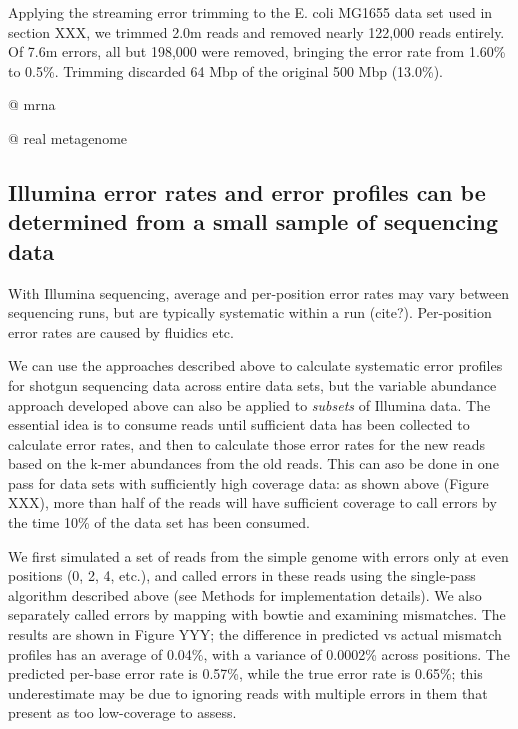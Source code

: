 \documentclass{article}
\begin{document}
Applying the streaming error trimming to the E. coli MG1655 data set
used in section XXX, we trimmed 2.0m reads and removed nearly 122,000
reads entirely.  Of 7.6m errors, all but 198,000 were removed,
bringing the error rate from 1.60\% to 0.5\%.  Trimming discarded 64
Mbp of the original 500 Mbp (13.0\%).


@ mrna


@ real metagenome

\subsection{Illumina error rates and error profiles can be determined from a
small sample of sequencing data}

With Illumina sequencing, average and per-position error rates may
vary between sequencing runs, but are typically systematic within a
run (cite?).  Per-position error rates are caused by fluidics etc.

We can use the approaches described above to calculate systematic
error profiles for shotgun sequencing data across entire data sets,
but the variable abundance approach developed above can also be
applied to {\em subsets} of Illumina data.  The essential idea is to
consume reads until sufficient data has been collected to calculate
error rates, and then to calculate those error rates for the new reads
based on the k-mer abundances from the old reads.  This can aso be
done in one pass for data sets with sufficiently high coverage data:
as shown above (Figure XXX), more than half of the reads will have
sufficient coverage to call errors by the time 10\% of the data set
has been consumed.

We first simulated a set of reads from the simple genome with errors
only at even positions (0, 2, 4, etc.), and called errors in these
reads using the single-pass algorithm described above (see Methods for
implementation details).  We also separately called errors by mapping
with bowtie and examining mismatches.  The results are shown in Figure
YYY; the difference in predicted vs actual mismatch profiles has an
average of 0.04\%, with a variance of 0.0002\% across positions.  The
predicted per-base error rate is 0.57\%, while the true error rate is
0.65\%; this underestimate may be due to ignoring reads with multiple
errors in them that present as too low-coverage to assess.
\end{document}
